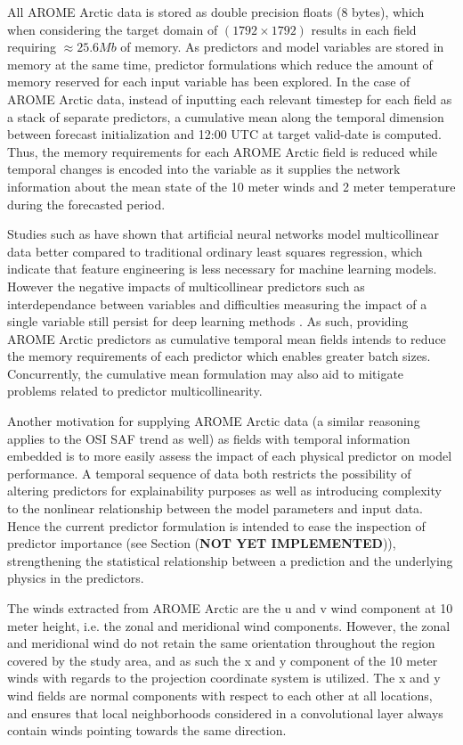 \documentclass[../main/thesis]{subfiles}
\begin{document}
All AROME Arctic data is stored as double precision floats (8 bytes), which when considering the target domain of $(1792 \times 1792)$ results in each field requiring $\approx 25.6 Mb$ of memory. As predictors and model variables are stored in memory at the same time, predictor formulations which reduce the amount of memory reserved for each input variable has been explored. In the case of AROME Arctic data, instead of inputting each relevant timestep for each field as a stack of separate predictors, a cumulative mean along the temporal dimension between forecast initialization and 12:00 UTC at target valid-date is computed. Thus, the memory requirements for each AROME Arctic field is reduced while temporal changes is encoded into the variable as it supplies the network information about the mean state of the 10 meter winds and 2 meter temperature during the forecasted period. 

Studies such as \citet{Obite2020} have shown that artificial neural networks model multicollinear data better compared to traditional ordinary least squares regression, which indicate that feature engineering is less necessary for machine learning models. However the negative impacts of multicollinear predictors such as interdependance between variables and difficulties measuring the impact of a single variable still persist for deep learning methods \citep{Chan2022}. As such, providing AROME Arctic predictors as cumulative temporal mean fields intends to reduce the memory requirements of each predictor which enables greater batch sizes. Concurrently, the cumulative mean formulation may also aid to mitigate problems related to predictor multicollinearity.

Another motivation for supplying AROME Arctic data (a similar reasoning applies to the OSI SAF trend as well) as fields with temporal information embedded is to more easily assess the impact of each physical predictor on model performance. A temporal sequence of data both restricts the possibility of altering predictors for explainability purposes as well as introducing complexity to the nonlinear relationship between the model parameters and input data. Hence the current predictor formulation is intended to ease the inspection of predictor importance (see Section (\textbf{NOT YET IMPLEMENTED})), strengthening the statistical relationship between a prediction and the underlying physics in the predictors.

The winds extracted from AROME Arctic are the u and v wind component at 10 meter height, i.e. the zonal and meridional wind components. However, the zonal and meridional wind do not retain the same orientation throughout the region covered by the study area, and as such the x and y component of the 10 meter winds with regards to the projection coordinate system is utilized. The x and y wind fields are normal components with respect to each other at all locations, and ensures that local neighborhoods considered in a convolutional layer always contain winds pointing towards the same direction.
\end{document}
